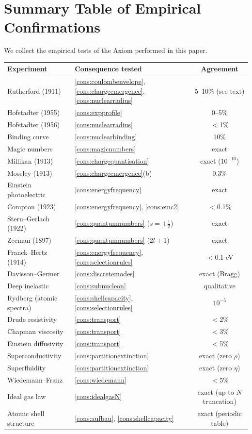 \documentclass[11pt,twocolumn,a4paper]{article}
\theoremstyle{axiomstyle}
\theoremstyle{conseqstyle}
\theoremstyle{definition}
\theoremstyle{remark}
\begin{document}
\section{Summary Table of Empirical Confirmations}
\label{sec:summarytable}

We collect the empirical tests of the Axiom performed in this paper.

\begin{center}
\small
\begin{tabular}{l|l|c}
\toprule
Experiment & Consequence tested & Agreement\\
\midrule
Rutherford (1911) & \ref{cons:coulombenvelope}, \ref{cons:chargeemergence}, \ref{cons:nuclearradius} & 5--10\% (see text)\\
Hofstadter (1955) & \ref{cons:expprofile} & 0--5\%\\
Hofstadter (1956) & \ref{cons:nuclearradius} & $<$1\%\\
Binding curve & \ref{cons:nuclearbinding} & 10\%\\
Magic numbers & \ref{cons:magicnumbers} & exact\\
Millikan (1913) & \ref{cons:chargequantisation} & exact ($10^{-10}$)\\
Moseley (1913) & \ref{cons:chargeemergence}(b) & 0.3\%\\
Einstein photoelectric & \ref{cons:energyfrequency} & exact\\
Compton (1923) & \ref{cons:energyfrequency}, \ref{cons:emc2} & $<$0.1\%\\
Stern--Gerlach (1922) & \ref{cons:quantumnumbers} ($s=\pm\tfrac12$) & exact\\
Zeeman (1897) & \ref{cons:quantumnumbers} ($2l+1$) & exact\\
Franck--Hertz (1914) & \ref{cons:energyfrequency}, \ref{cons:selectionrules} & $<$0.1 eV\\
Davisson--Germer & \ref{cons:discretemodes} & exact (Bragg)\\
Deep inelastic & \ref{cons:subnucleon} & qualitative\\
Rydberg (atomic spectra) & \ref{cons:shellcapacity}, \ref{cons:selectionrules} & $10^{-5}$\\
Drude resistivity & \ref{cons:transport} & $<$2\%\\
Chapman viscosity & \ref{cons:transport} & $<$3\%\\
Einstein diffusivity & \ref{cons:transport} & $<$5\%\\
Superconductivity & \ref{cons:partitionextinction} & exact (zero $\rho$)\\
Superfluidity & \ref{cons:partitionextinction} & exact (zero $\eta$)\\
Wiedemann--Franz & \ref{cons:wiedemann} & $<$5\%\\
Ideal gas law & \ref{cons:idealgasN} & exact (up to $N$ truncation)\\
Atomic shell structure & \ref{cons:aufbau}, \ref{cons:shellcapacity} & exact (periodic table)\\
\bottomrule
\end{tabular}
\end{center}
\end{document}
